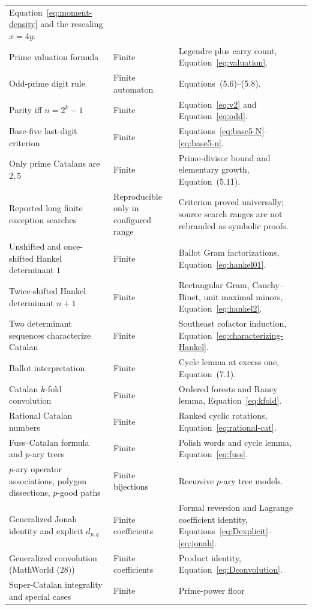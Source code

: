 \begin{longtable}{@{}p{}p{}p{}@{}}
Equation~\eqref{eq:moment-density} and the rescaling $x=4y$.\\
Prime valuation formula & Finite & Legendre plus carry count,
Equation~\eqref{eq:valuation}.\\
Odd-prime digit rule & Finite automaton & Equations~(5.6)--(5.8).\\
Parity iff $n=2^k-1$ & Finite & Equation~\eqref{eq:v2} and
Equation~\eqref{eq:odd}.\\
Base-five last-digit criterion & Finite & Equations~\eqref{eq:base5-N}--\eqref{eq:base5-n}.\\
Only prime Catalans are $2,5$ & Finite & Prime-divisor bound and elementary
growth, Equation~(5.11).\\
Reported long finite exception searches & Reproducible only in configured
range & Criterion proved universally; source search ranges are not rebranded
as symbolic proofs.\\
Unshifted and once-shifted Hankel determinant $1$ & Finite & Ballot Gram
factorizations, Equation~\eqref{eq:hankel01}.\\
Twice-shifted Hankel determinant $n+1$ & Finite & Rectangular Gram,
Cauchy--Binet, unit maximal minors, Equation~\eqref{eq:hankel2}.\\
Two determinant sequences characterize Catalan & Finite & Southeast cofactor
induction, Equation~\eqref{eq:characterizing-Hankel}.\\
Ballot interpretation & Finite & Cycle lemma at excess one,
Equation~(7.1).\\
Catalan $k$-fold convolution & Finite & Ordered forests and Raney lemma,
Equation~\eqref{eq:kfold}.\\
Rational Catalan numbers & Finite & Ranked cyclic rotations,
Equation~\eqref{eq:rational-cat}.\\
Fuss--Catalan formula and $p$-ary trees & Finite & Polish words and cycle
lemma, Equation~\eqref{eq:fuss}.\\
$p$-ary operator associations, polygon dissections, $p$-good paths & Finite
bijections & Recursive $p$-ary tree models.\\
Generalized Jonah identity and explicit $d_{p,q}$ & Finite coefficients &
Formal reversion and Lagrange coefficient identity,
Equations~\eqref{eq:Dexplicit}--\eqref{eq:jonah}.\\
Generalized convolution (MathWorld (28)) & Finite coefficients & Product
identity, Equation~\eqref{eq:Dconvolution}.\\
Super-Catalan integrality and special cases & Finite & Prime-power floor

\end{longtable}

